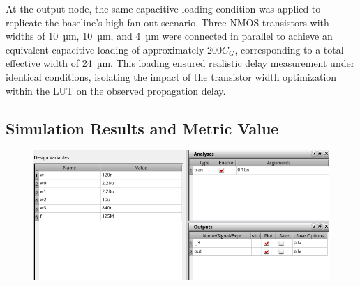 \documentclass[12pt]{article}
\begin{document}
At the output node, the same capacitive loading condition was applied to replicate the baseline’s high fan-out scenario. Three NMOS transistors with widths of 10~µm, 10~µm, and 4~µm were connected in parallel to achieve an equivalent capacitive loading of approximately 200$C_G$, corresponding to a total effective width of 24~µm. This loading ensured realistic delay measurement under identical conditions, isolating the impact of the transistor width optimization within the LUT on the observed propagation delay.

\newpage

\subsection{Simulation Results and Metric Value}

\begin{figure}[H]
    \centering
    \includegraphics[width=0.8\linewidth]{writeup//figures/optimized_delay_ADEL_setup.png}
    \caption{}
\end{figure}
\end{document}
